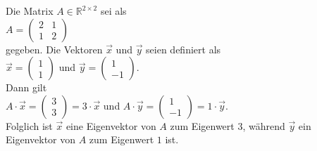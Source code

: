 \example
Die Matrix $A \in \mathbb{R}^{2 \times 2}$ sei als
\\[0.2cm]
\hspace*{1.3cm}
$A = \left(
  \begin{array}{ll}
    2 & 1 \\
    1 & 2
  \end{array}
  \right)
$
\\[0.2cm]
gegeben.  Die Vektoren $\vec{x}$ und $\vec{y}$ seien definiert als
\\[0.2cm]
\hspace*{1.3cm}
$\vec{x} = \left(
\begin{array}{r}
  1 \\
  1    
\end{array}\right)
$ \quad und \quad 
$\vec{y} = \left(
\begin{array}{r}
  1 \\
  -1    
\end{array}
\right)
$.
\\[0.2cm]
Dann gilt 
\\[0.2cm]
\hspace*{1.3cm}
$A \cdot \vec{x} = \left(
\begin{array}{r}
  3 \\
  3    
\end{array}\right) = 3 \cdot \vec{x}$ \quad und \quad
$A \cdot \vec{y} = \left(
\begin{array}{r}
  1 \\
  -1    
\end{array}\right) = 1 \cdot \vec{y}$.
\\[0.2cm]
Folglich ist $\vec{x}$ eine Eigenvektor von $A$ zum Eigenwert $3$, w\"ahrend $\vec{y}$ ein
Eigenvektor von $A$ zum Eigenwert $1$ ist.  \eox

